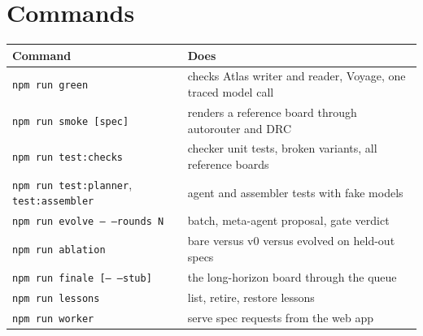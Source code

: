 \documentclass[11pt,a4paper]{article}
\newcommand{\code}[1]{\texttt{#1}}
\begin{document}
\section{Commands}

\begin{center}
\begin{tabular}{@{}L{5cm}L{10cm}@{}}
\toprule
Command & Does \\
\midrule
\code{npm run green} & checks Atlas writer and reader, Voyage, one traced model call \\
\code{npm run smoke [spec]} & renders a reference board through autorouter and DRC \\
\code{npm run test:checks} & checker unit tests, broken variants, all reference boards \\
\code{npm run test:planner}, \code{test:assembler} & agent and assembler tests with fake models \\
\code{npm run evolve -- --rounds N} & batch, meta-agent proposal, gate verdict \\
\code{npm run ablation} & bare versus v0 versus evolved on held-out specs \\
\code{npm run finale [-- --stub]} & the long-horizon board through the queue \\
\code{npm run lessons} & list, retire, restore lessons \\
\code{npm run worker} & serve spec requests from the web app \\
\bottomrule
\end{tabular}
\end{center}
\end{document}
